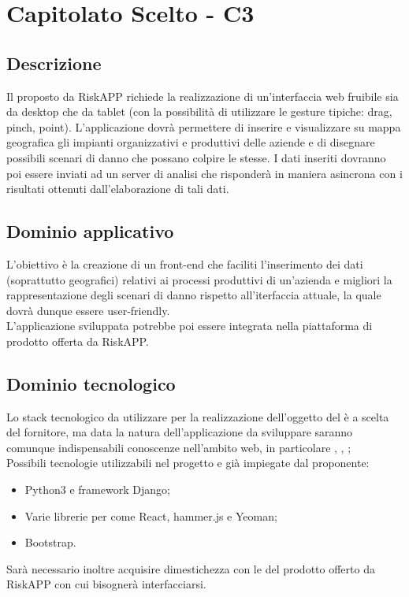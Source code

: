 
\section {Capitolato Scelto - C3}


\subsection {Descrizione}
Il  proposto da RiskAPP richiede la realizzazione di un’interfaccia web fruibile sia da desktop che da tablet (con la possibilità di utilizzare le gesture tipiche: drag, pinch, point). L’applicazione dovrà permettere di inserire e visualizzare su mappa geografica gli impianti organizzativi e produttivi delle aziende e di disegnare possibili scenari di danno che possano colpire le stesse. I dati inseriti dovranno poi essere inviati ad un server di analisi che risponderà in maniera asincrona con i risultati ottenuti dall'elaborazione di tali dati.


\subsection {Dominio applicativo}
L'obiettivo è la creazione di un front-end che faciliti l'inserimento dei dati (soprattutto geografici) relativi ai processi produttivi di un'azienda e migliori la rappresentazione degli scenari di danno rispetto all'iterfaccia attuale, la quale dovrà dunque essere user-friendly. \\
L'applicazione sviluppata potrebbe poi essere integrata nella piattaforma di prodotto offerta da RiskAPP.


\subsection {Dominio tecnologico}
Lo stack tecnologico da utilizzare per la realizzazione dell'oggetto del  è a scelta del fornitore, ma data la natura dell'applicazione da sviluppare saranno comunque indispensabili conoscenze nell'ambito web, in particolare , , ; \\
Possibili tecnologie utilizzabili nel progetto e già impiegate dal proponente:
\begin{itemize}
	\item Python3 e framework Django;
	\item Varie librerie per  come React, hammer.js e Yeoman;
	\item Bootstrap.
\end{itemize}
Sarà necessario inoltre acquisire dimestichezza con le  del prodotto offerto da RiskAPP con cui bisognerà interfacciarsi.



